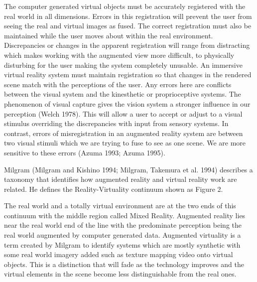 The computer generated virtual objects must be accurately registered with the real world in all dimensions. Errors in this registration will prevent the user from seeing the real and virtual images as fused. The correct registration must also be maintained while the user moves about within the real environment. Discrepancies or changes in the apparent registration will range from distracting which makes working with the augmented view more difficult, to physically disturbing for the user making the system completely unusable. An immersive virtual reality system must maintain registration so that changes in the rendered scene match with the perceptions of the user. Any errors here are conflicts between the visual system and the kinesthetic or proprioceptive systems. The phenomenon of visual capture gives the vision system a stronger influence in our perception (Welch 1978). This will allow a user to accept or adjust to a visual stimulus overriding the discrepancies with input from sensory systems. In contrast, errors of misregistration in an augmented reality system are between two visual stimuli which we are trying to fuse to see as one scene. We are more sensitive to these errors (Azuma 1993; Azuma 1995).

Milgram (Milgram and Kishino 1994; Milgram, Takemura et al. 1994) describes a taxonomy that identifies how augmented reality and virtual reality work are related. He defines the Reality-Virtuality continuum shown as Figure 2.


The real world and a totally virtual environment are at the two ends of this continuum with the middle region called Mixed Reality. Augmented reality lies near the real world end of the line with the predominate perception being the real world augmented by computer generated data. Augmented virtuality is a term created by Milgram to identify systems which are mostly synthetic with some real world imagery added such as texture mapping video onto virtual objects. This is a distinction that will fade as the technology improves and the virtual elements in the scene become less distinguishable from the real ones.

